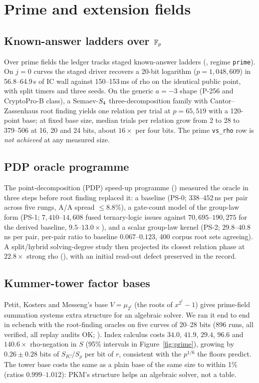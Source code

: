 \section{Prime and extension fields}\label{sec:prime}

\subsection{Known-answer ladders over $\mathbb{F}_p$}

Over prime fields the ledger tracks staged known-answer ladders
(, regime \texttt{prime}). On $j=0$
curves the staged driver recovers a 20-bit logarithm
($p=1{,}048{,}609$) in 56.8--64.9\,s of IC wall against 150--153\,ms of rho
on the identical public point, with split timers and three seeds. On the
generic $a=-3$ shape (P-256 and CryptoPro-B class), a Semaev-$S_{4}$
three-decomposition family with Cantor--Zassenhaus root finding yields one
relation per trial at $p=65{,}519$ with a 120-point base; at fixed base
size, median trials per relation grow from 2 to 28 to 379--506 at 16, 20
and 24 bits, about $16\times$ per four bits. The prime \texttt{vs\_rho}
row is \emph{not achieved} at any measured size.

\subsection{PDP oracle programme}

The point-decomposition (PDP) speed-up programme
() measured the oracle in three
steps before root finding replaced it: a baseline (PS-0; $338$--$452$\,ns
per pair across five rungs, A/A spread $\le8.8\%$), a gate-count model of
the group-law form (PS-1; $7{,}410$--$14{,}608$ fused ternary-logic issues
against $70{,}695$--$190{,}275$ for the derived baseline, $9.5$--$13.0\times$),
and a scalar group-law kernel (PS-2; $29.8$--$40.8$\,ns per pair, per-pair
ratio to baseline $0.067$--$0.123$, 400 corpus root sets agreeing). A
split/hybrid solving-degree study then projected its closest relation phase
at $22.8\times$ strong rho (), with
an initial read-out defect preserved in the record.

\subsection{Kummer-tower factor bases}

Petit, Kosters and Messeng's base $V=\mu_{2^t}$ (the roots of
$x^{2^t}-1$) gives prime-field summation systems extra structure for an
algebraic solver. We ran it end to end in ecbench with the root-finding
oracles on five curves of 20--28 bits (896 runs, all verified, all replay
audits OK; ). Index calculus
costs $34.0$, $41.9$, $29.4$, $96.6$ and $140.6\times$ rho-negation in $S$
(95\% intervals in Figure~\ref{fig:prime}), growing by $0.26\pm0.28$ bits of
$S_{IC}/S_\rho$ per bit of $r$, consistent with the $p^{1/6}$ the floors
predict. The tower base costs the same as a plain base of the same size to
within 1\% (ratios $0.999$--$1.012$): PKM's structure helps an algebraic
solver, not a table.

